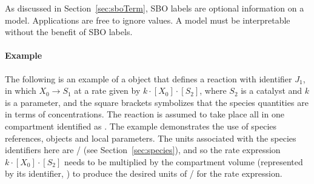As discussed in Section~\ref{sec:sboTerm}, SBO labels are optional
information on a model.  Applications are free to ignore
 values.  A model must be interpretable without the
benefit of SBO labels.


\paragraph{Example}

The following is an example of a \Reaction object that defines a
reaction with identifier $J_1$, in which $X_0 \rightarrow S_1$ at
a rate given by $k \cdot [X_0] \cdot [S_2]$, where $S_2$ is a
catalyst and $k$ is a parameter, and the square brackets
symbolizes that the species quantities are in terms of
concentrations.  The reaction is assumed to take place all in one
compartment identified as .  The example demonstrates the
use of species references, \KineticLaw objects and local
parameters.  The units associated with the species identifiers
here are / (see
Section~\ref{sec:species}), and so the rate expression $k \cdot
[X_0] \cdot [S_2]$ needs to be multiplied by the compartment
volume (represented by its identifier, ) to produce the
desired units of / for the rate
expression.

